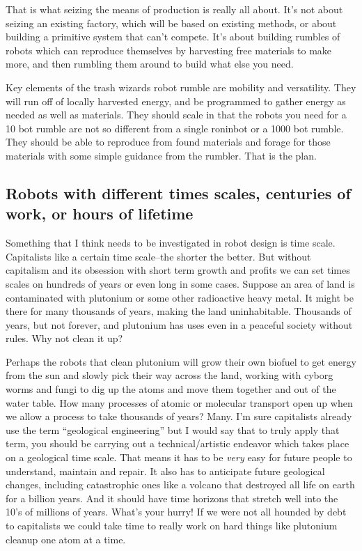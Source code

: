 That is what seizing the means of production is really all about. It's
not about seizing an existing factory, which will be based on existing
methods, or about building a primitive system that can't compete. It's
about building rumbles of robots which can reproduce themselves by
harvesting free materials to make more, and then rumbling them around to
build what else you need.

Key elements of the trash wizards robot rumble are mobility and
versatility. They will run off of locally harvested energy, and be
programmed to gather energy as needed as well as materials. They should
scale in that the robots you need for a 10 bot rumble are not so
different from a single roninbot or a 1000 bot rumble. They should be
able to reproduce from found materials and forage for those materials
with some simple guidance from the rumbler. That is the plan.

\subsection{Robots with different times scales, centuries of work, or
hours of
lifetime}\label{robots-with-different-times-scales-centuries-of-work-or-hours-of-lifetime}

Something that I think needs to be investigated in robot design is time
scale. Capitalists like a certain time scale--the shorter the better.
But without capitalism and its obsession with short term growth and
profits we can set times scales on hundreds of years or even long in
some cases. Suppose an area of land is contaminated with plutonium or
some other radioactive heavy metal. It might be there for many thousands
of years, making the land uninhabitable. Thousands of years, but not
forever, and plutonium has uses even in a peaceful society without
rules. Why not clean it up?

Perhaps the robots that clean plutonium will grow their own biofuel to
get energy from the sun and slowly pick their way across the land,
working with cyborg worms and fungi to dig up the atoms and move them
together and out of the water table. How many processes of atomic or
molecular transport open up when we allow a process to take thousands of
years? Many. I'm sure capitalists already use the term ``geological
engineering'' but I would say that to truly apply that term, you should
be carrying out a technical/artistic endeavor which takes place on a
geological time scale. That means it has to be \emph{very} easy for
future people to understand, maintain and repair. It also has to
anticipate future geological changes, including catastrophic ones like a
volcano that destroyed all life on earth for a billion years. And it
should have time horizons that stretch well into the 10's of millions of
years. What's your hurry! If we were not all hounded by debt to
capitalists we could take time to really work on hard things like
plutonium cleanup one atom at a time.


